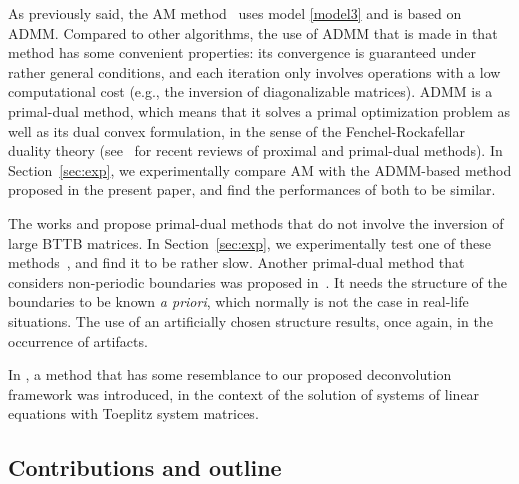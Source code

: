 \documentclass[10pt,twocolumn,twoside]{IEEEtran}
\begin{document}
As previously said, the AM method~\cite{Almeida2013a,Matakos2013} uses model \eqref{model3} and is based on ADMM. Compared to other algorithms, the use of ADMM that is made in that method has some convenient properties: its convergence is guaranteed under rather general conditions, and each iteration only involves operations with a low computational cost (e.g., the inversion of diagonalizable matrices). ADMM is a primal-dual method, which means that it solves a primal optimization problem as well as its dual convex formulation, in the sense of the Fenchel-Rockafellar duality theory (see~\cite{Combettes2009, Parikh2013, Komodakis2014} for recent reviews of proximal and primal-dual methods). In Section~\ref{sec:exp}, we experimentally compare AM with the ADMM-based method proposed in the present paper, and find the performances of both to be similar.

The works \cite{Condat2013} and \cite{Combettes2014} propose primal-dual methods that do not involve the inversion of large BTTB matrices. In Section~\ref{sec:exp}, we experimentally test one of these methods~\cite{Condat2013}, and find it to be rather slow. Another primal-dual method that considers non-periodic boundaries was proposed in~\cite{OConnor2014}. It needs the structure of the boundaries to be known \textit{a priori}, which normally is not the case in real-life situations. The use of an artificially chosen structure results, once again, in the occurrence of artifacts.

In \cite{Ferreira2010}, a method that has some resemblance to our proposed deconvolution framework was introduced, in the context of the solution of systems of linear equations with Toeplitz system matrices. 



\subsection{Contributions and outline}
\end{document}
